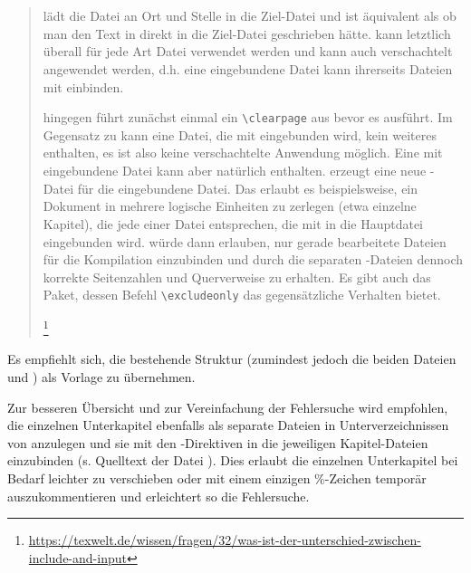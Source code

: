 \begin{quote}
{\small
\verb++ lädt die Datei an Ort und Stelle in die Ziel-Datei und ist äquivalent
als ob man den Text in  direkt in die Ziel-Datei geschrieben hätte.
\verb++ kann letztlich überall für jede Art Datei verwendet werden und kann auch verschachtelt angewendet werden,
d.h. eine eingebundene Datei kann ihrerseits Dateien mit \verb++ einbinden.

\verb++ hingegen führt zunächst einmal ein \verb+\clearpage+ aus bevor es \verb++ ausführt.
Im Gegensatz zu \verb++ kann eine Datei, die mit \verb++ eingebunden wird,
kein weiteres \verb++ enthalten, es ist also keine verschachtelte Anwendung möglich.
Eine mit \verb++ eingebundene Datei kann aber natürlich \verb++ enthalten.
\verb++ erzeugt eine neue -Datei für die eingebundene Datei.
Das erlaubt es beispielsweise, ein Dokument in mehrere logische Einheiten zu zerlegen (etwa einzelne Kapitel),
die jede einer Datei entsprechen, die mit \verb++ in die Hauptdatei eingebunden wird.
\verb++ würde dann erlauben, nur gerade bearbeitete Dateien für die Kompilation einzubinden
und durch die separaten -Dateien dennoch korrekte Seitenzahlen und Querverweise zu erhalten.
Es gibt auch das  Paket, dessen Befehl \verb+\excludeonly+ das gegensätzliche Verhalten bietet.%
}%
\footnote{\url{https://texwelt.de/wissen/fragen/32/was-ist-der-unterschied-zwischen-include-and-input}}
\end{quote}

Es empfiehlt sich, die bestehende Struktur (zumindest jedoch die beiden Dateien
 und )
als Vorlage zu übernehmen.

Zur besseren Übersicht und zur Vereinfachung der Fehlersuche wird empfohlen,
die einzelnen Unterkapitel ebenfalls als separate Dateien in Unterverzeichnissen von  anzulegen
und sie mit den \verb++-Direktiven in die jeweiligen Kapitel-Dateien einzubinden
(s. Quelltext der Datei ).
Dies erlaubt die einzelnen Unterkapitel bei Bedarf leichter zu verschieben 
oder mit einem einzigen \%-Zeichen temporär auszukommentieren 
und erleichtert so die Fehlersuche.

